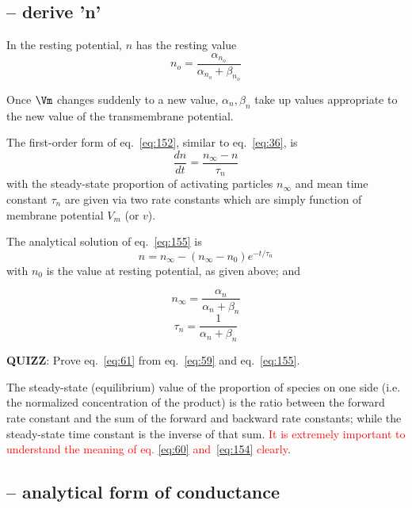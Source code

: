 \subsection{-- derive 'n'}

In the resting potential, $n$ has the resting value
\begin{equation}
n_o = \frac{\alpha_{n_o}}{\alpha_{n_o}+\beta_{n_o}}
\end{equation}

Once $\Vm$ changes suddenly to a new value, $\alpha_n, \beta_n$ take up values
appropriate to the new value of the transmembrane potential. 

The first-order form of eq.~\eqref{eq:152}, similar to
eq.~\eqref{eq:36}, is
\begin{equation}
  \label{eq:155}
  \frac{dn}{dt} = \frac{n_\infty - n}{\tau_n}
\end{equation}
with the steady-state proportion of activating particles $n_\infty$ and mean
time constant $\tau_n$ are given via two rate constants which are simply function of
membrane potential $V_m$ (or $v$).

The analytical solution of eq.~\eqref{eq:155} is
\begin{equation}
  \label{eq:61}
  n = n_\infty - (n_\infty - n_0) e^{-t/\tau_n}
\end{equation}
with $n_0$ is the value at resting potential, as given above; and

\begin{equation}
  \label{eq:60}
  n_\infty = \frac{\alpha_n}{\alpha_n+\beta_n}
\end{equation}
\begin{equation}
  \label{eq:154}
  \tau_n = \frac{1}{\alpha_n+\beta_n}
\end{equation}

{\bf QUIZZ}: Prove eq.~\eqref{eq:61} from eq.~\eqref{eq:59} and
eq.~\eqref{eq:155}.

The steady-state (equilibrium) value of the proportion of species on one side
(i.e. the normalized concentration of the product) is the ratio between the
forward rate constant and the sum of the forward and backward rate constants;
while the steady-state time constant is the inverse of that sum.
\textcolor{red}{It is extremely important to understand the meaning of
  eq. \eqref{eq:60} and~\eqref{eq:154} clearly}.

\subsection{-- analytical form of conductance}
\label{sec:conductance-K+-current-HH-analytical-form}

